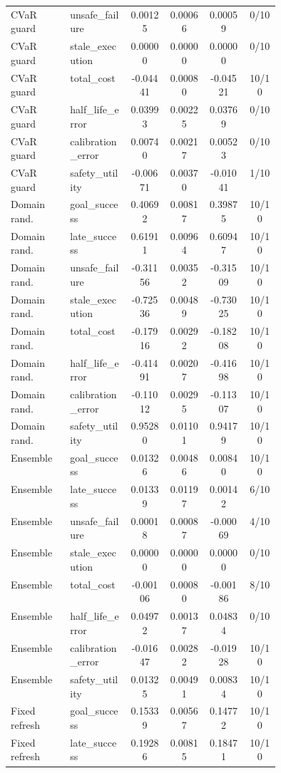 \documentclass{article}
\begin{document}
\begin{center}
\begin{longtable}{p{0.22\linewidth}p{0.22\linewidth}cccc}
CVaR guard & unsafe\_failure & 0.00125 & 0.00066 & 0.00059 & 0/10\\
CVaR guard & stale\_execution & 0.00000 & 0.00000 & 0.00000 & 0/10\\
CVaR guard & total\_cost & -0.04441 & 0.00080 & -0.04521 & 10/10\\
CVaR guard & half\_life\_error & 0.03993 & 0.00225 & 0.03769 & 0/10\\
CVaR guard & calibration\_error & 0.00740 & 0.00217 & 0.00523 & 0/10\\
CVaR guard & safety\_utility & -0.00671 & 0.00370 & -0.01041 & 1/10\\
Domain rand. & goal\_success & 0.40692 & 0.00817 & 0.39875 & 10/10\\
Domain rand. & late\_success & 0.61911 & 0.00964 & 0.60947 & 10/10\\
Domain rand. & unsafe\_failure & -0.31156 & 0.00352 & -0.31509 & 10/10\\
Domain rand. & stale\_execution & -0.72536 & 0.00489 & -0.73025 & 10/10\\
Domain rand. & total\_cost & -0.17916 & 0.00292 & -0.18208 & 10/10\\
Domain rand. & half\_life\_error & -0.41491 & 0.00207 & -0.41698 & 10/10\\
Domain rand. & calibration\_error & -0.11012 & 0.00295 & -0.11307 & 10/10\\
Domain rand. & safety\_utility & 0.95280 & 0.01101 & 0.94179 & 10/10\\
Ensemble & goal\_success & 0.01326 & 0.00486 & 0.00840 & 10/10\\
Ensemble & late\_success & 0.01339 & 0.01197 & 0.00142 & 6/10\\
Ensemble & unsafe\_failure & 0.00018 & 0.00087 & -0.00069 & 4/10\\
Ensemble & stale\_execution & 0.00000 & 0.00000 & 0.00000 & 0/10\\
Ensemble & total\_cost & -0.00106 & 0.00080 & -0.00186 & 8/10\\
Ensemble & half\_life\_error & 0.04972 & 0.00137 & 0.04834 & 0/10\\
Ensemble & calibration\_error & -0.01647 & 0.00282 & -0.01928 & 10/10\\
Ensemble & safety\_utility & 0.01325 & 0.00491 & 0.00834 & 10/10\\
Fixed refresh & goal\_success & 0.15339 & 0.00567 & 0.14772 & 10/10\\
Fixed refresh & late\_success & 0.19286 & 0.00815 & 0.18471 & 10/10\\

\end{longtable}
\end{center}
\end{document}
